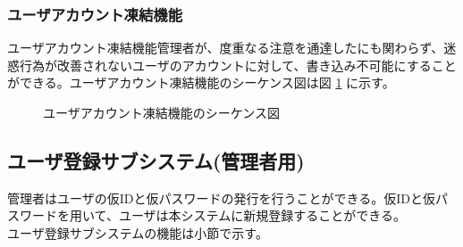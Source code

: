\documentclass[a4j]{jarticle}
\begin{document}
  \subsubsection{ユーザアカウント凍結機能}
  ユーザアカウント凍結機能管理者が、度重なる注意を通達したにも関わらず、迷惑行為が改善されないユーザのアカウントに対して、書き込み不可能にすることができる。ユーザアカウント凍結機能のシーケンス図は図 \ref{fig:admin_user-suspend.png} に示す。
  \begin{figure}[H]
    \centering
    \caption{ユーザアカウント凍結機能のシーケンス図}
    \label{fig:admin_user-suspend.png}
  \end{figure}
  \subsection{ユーザ登録サブシステム(管理者用)}
  管理者はユーザの仮IDと仮パスワードの発行を行うことができる。仮IDと仮パスワードを用いて、ユーザは本システムに新規登録することができる。\\
  ユーザ登録サブシステムの機能は小節で示す。
\end{document}
